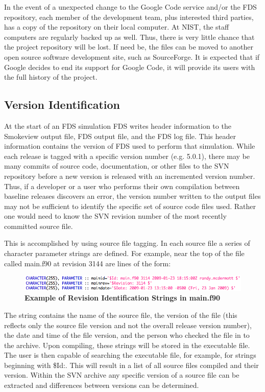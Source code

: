 \documentclass[11pt]{book}
\begin{document}
In the event of a unexpected change to the Google Code service and/or the FDS repository, each member of the development team, plus interested third parties, has a copy of the repository on their local computer. At NIST, the staff computers are regularly backed up as well. Thus, there is very little chance that the project repository will be lost. If need be, the files can be moved to another open source software development site, such as SourceForge. It is expected that if Google decides to end its support for Google Code, it will provide its users with the full history of the project.

\subsection{Version Identification}

At the start of an FDS simulation FDS writes header information to the Smokeview output file, FDS output file,
and the FDS log file.  This header information contains the version of FDS used to perform that simulation.
While each release is tagged with a specific version number (e.g. 5.0.1), there may be many commits of source
code, documentation, or other files to the SVN repository before a new version is released with an incremented
version number.  Thus, if a developer or a user who performs their own compilation between baseline releases
discovers an error, the version number written to the output files may not be sufficient to identify the
specific set of source code files used.  Rather one would need to know the SVN revision number of the most
recently committed source file.

This is accomplished by using source file tagging.  In each source file a series of character parameter
strings are defined.  For example, near the top of the file called main.f90 at revision 3144 are lines of the form:

\begin{figure}[ht!]
\includegraphics[width=\textwidth]{FIGURES/RevisionStrings.jpg}
\caption{\bf Example of Revision Identification Strings in main.f90}
\label{fig:revstrings}
\end{figure}

\noindent
The string contains the name of the source file, the version of the file (this reflects only the source
file version and not the overall release version number), the date and time of the file version, and
the person who checked the file in to the archive.  Upon compiling, these strings will be stored in the
executable file.  The user is then capable of searching the executable file, for example, for strings
beginning with {\ct \$Id:}.  This will result in a list of all source files compiled and their version.
Within the SVN archive any specific version of a source file can be extracted and differences between
versions can be determined.
\end{document}
